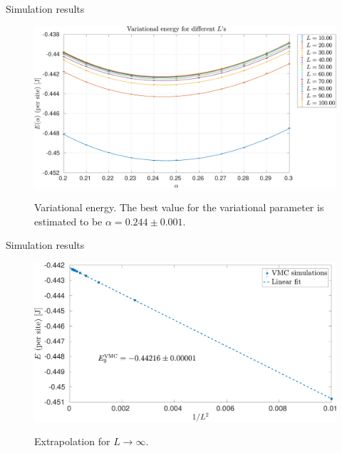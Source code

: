 \documentclass[10pt, compress, protectframetitle, handout]{beamer}
\begin{document}
\begin{frame}{Simulation results}

	\begin{figure}
		\centering
		\includegraphics[width=\textwidth]{VariationalEnergies}
		\label{fig:VariationalEnergies}
		\caption{Variational energy. The best value for the variational parameter is estimated to be $\alpha = 0.244 \pm 0.001$.}
	\end{figure}
	
\end{frame}

\begin{frame}{Simulation results}

	\begin{figure}
		\centering
		\includegraphics[width=\textwidth]{E_VMC}
		\label{fig:E_VMC}
		\caption{Extrapolation for $L \to \infty$.}
	\end{figure}
	
\end{frame}
\end{document}
